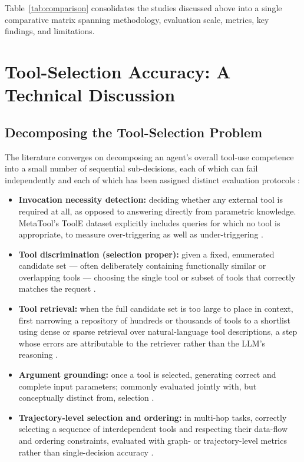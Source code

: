 \documentclass[acmsmall]{acmart}
\begin{document}
Table~\ref{tab:comparison} consolidates the studies discussed above into a single comparative matrix spanning methodology, evaluation scale, metrics, key findings, and limitations.


\section{Tool-Selection Accuracy: A Technical Discussion}
\label{sec:technical}

\subsection{Decomposing the Tool-Selection Problem}
\label{sec:decompose}

The literature converges on decomposing an agent's overall tool-use competence into a small number of sequential sub-decisions, each of which can fail independently and each of which has been assigned distinct evaluation protocols \citep{mohammadi2025evaluation,qu2025survey}:

\begin{itemize}
  \item \textbf{Invocation necessity detection:} deciding whether any external tool is required at all, as opposed to answering directly from parametric knowledge. MetaTool's ToolE dataset explicitly includes queries for which no tool is appropriate, to measure over-triggering as well as under-triggering \citep{huang2024metatool}.
  \item \textbf{Tool discrimination (selection proper):} given a fixed, enumerated candidate set --- often deliberately containing functionally similar or overlapping tools --- choosing the single tool or subset of tools that correctly matches the request \citep{huang2024metatool,qin2024toolllm}.
  \item \textbf{Tool retrieval:} when the full candidate set is too large to place in context, first narrowing a repository of hundreds or thousands of tools to a shortlist using dense or sparse retrieval over natural-language tool descriptions, a step whose errors are attributable to the retriever rather than the LLM's reasoning \citep{shi2025toolretrieval,qin2024toolllm}.
  \item \textbf{Argument grounding:} once a tool is selected, generating correct and complete input parameters; commonly evaluated jointly with, but conceptually distinct from, selection \citep{patil2023gorilla,patil2025bfcl}.
  \item \textbf{Trajectory-level selection and ordering:} in multi-hop tasks, correctly selecting a sequence of interdependent tools and respecting their data-flow and ordering constraints, evaluated with graph- or trajectory-level metrics rather than single-decision accuracy \citep{shen2023taskbench,he2025trajectbench}.
\end{itemize}
\end{document}
